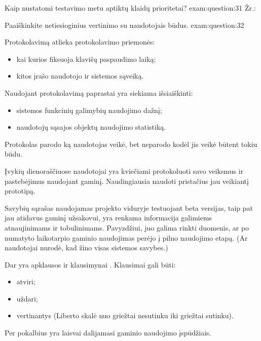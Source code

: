 \begin{question}{%
  Kaip nustatomi testavimo metu aptiktų klaidų prioritetai?
  }{exam:question:31}
  Žr.: \cite[20--22]{skaidres-10}
\end{question}

\begin{question}{%
  Paaiškinkite netiesioginius vertinimo su naudotojais būdus.
  }{exam:question:32}

  Protokolavimą atlieka protokolavimo priemonės\cite[37]{skaidres-10}:
  \begin{itemize}
    \item kai kurios fiksuoja klavišų paspaudimo laiką;
    \item kitos įrašo naudotojo ir sistemos sąveiką.
  \end{itemize}
  Naudojant protokolavimą paprastai yra siekiama
  išsiaiškinti\cite[38]{skaidres-10}:
  \begin{itemize}
    \item sistemos funkcinių galimybių naudojimo dažnį;
    \item naudotojų sąsajos objektų naudojimo statistiką.
  \end{itemize}
  Protokolas parodo ką naudotojas veikė, bet neparodo kodėl jis veikė
  būtent tokiu būdu.

  Įvykių dienoraščiuose\cite[49]{skaidres-10} naudotojai yra kviečiami
  protokoluoti savo veiksmus ir pastebėjimus naudojant gaminį.
  Naudingiausia naudoti pristačius jau veikiantį prototipą.

  Savybių sąrašas \cite[56]{skaidres-10} naudojamas projekto viduryje
  testuojant beta versijas, taip pat jau atidavus gaminį užsakovui,
  yra renkama informacija galimiems atnaujinimams ir tobulinimams.
  Pavyzdžiui, juo galima rinkti duomenis, ar po numatyto laikotarpio
  gaminio naudojimas perėjo į pilno naudojimo etapą. (Ar naudotojai
  nurodė, kad žino visas sistemos savybes.)

  Dar yra apklausos ir klausimynai \cite[62]{skaidres-10}. Klausimai
  gali būti:
  \begin{itemize}
    \item atviri;
    \item uždari;
    \item vertinantys (Liberto skalė nuo griežtai nesutinku iki griežtai
      sutinku).
  \end{itemize}

  Per pokalbius \cite[64]{skaidres-10} yra laisvai dalijamasi gaminio
  naudojimo įspūdžiais.
\end{question}

